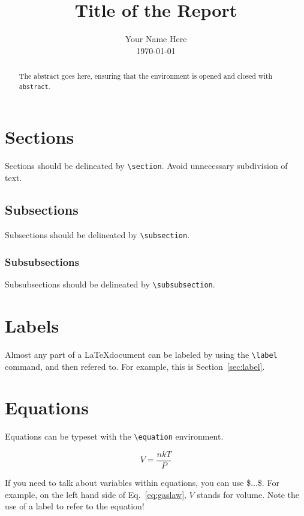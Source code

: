 \documentclass[12pt]{iopart}
\begin{document}
\title[Your Name Here]{Title of the Report}

\author{Your Name Here \\ \today} %

\begin{abstract}
The abstract goes here, ensuring that the environment is opened and closed with \texttt{abstract}.

\end{abstract}

\section{Sections}

Sections should be delineated by \texttt{\textbackslash section}. Avoid unnecessary subdivision of text.

\subsection{Subsections}

Subsections should be delineated by \texttt{\textbackslash subsection}.

\subsubsection{Subsubsections}

Subsubsections should be delineated by \texttt{\textbackslash subsubsection}.

\section{Labels \label{sec:label}}

Almost any part of a \LaTeX document can be labeled by using the \texttt{\textbackslash label} command, and then refered to. For example, this is Section~\ref{sec:label}.

\section{Equations}

Equations can be typeset with the \texttt{\textbackslash equation} environment.

\begin{equation}
V=\frac{nkT}{P}
\label{eq:gaslaw}
\end{equation}

If you need to talk about variables within equations, you can use \$...\$. For example, on the left hand side of Eq.~\ref{eq:gaslaw}, $V$ stands for volume. Note the use of a label to refer to the equation!
\end{document}
